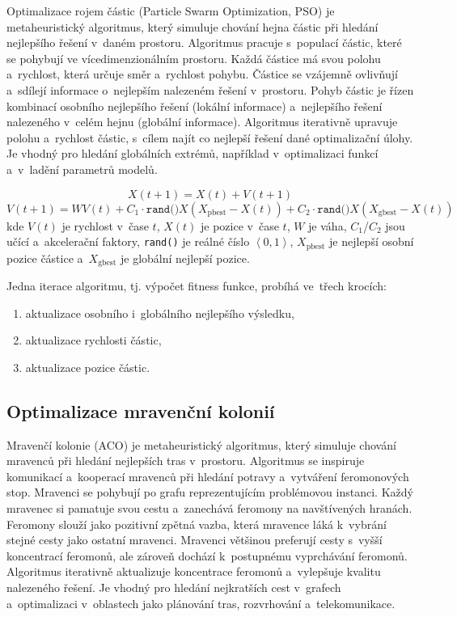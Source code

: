 Optimalizace rojem částic (Particle Swarm Optimization, PSO) je metaheuristický algoritmus, který simuluje chování hejna částic při hledání nejlepšího řešení v~daném prostoru.
Algoritmus pracuje s~populací částic, které se pohybují ve vícedimenzionálním prostoru.
Každá částice má svou polohu a~rychlost, která určuje směr a~rychlost pohybu.
Částice se vzájemně ovlivňují a~sdílejí informace o~nejlepším nalezeném řešení v~prostoru.
Pohyb částic je řízen kombinací osobního nejlepšího řešení (lokální informace) a~nejlepšího řešení nalezeného v~celém hejnu (globální informace).
Algoritmus iterativně upravuje polohu a~rychlost částic, s~cílem najít co nejlepší řešení dané optimalizační úlohy. Je vhodný pro hledání globálních extrémů, například v~optimalizaci funkcí a~v~ladění parametrů modelů.

$$X(t+1) = X(t) + V(t+1)$$
$$V(t+1) = WV(t) + C_1 \cdot \mathrm{\texttt{rand()}} X (X_\mathrm{pbest} - X(t)) + C_2 \cdot \mathrm{\texttt{rand()}} X (X_\mathrm{gbest} - X(t))$$
%
kde $V(t)$ je rychlost v~čase $t$, $X(t)$ je pozice v~čase $t$, $W$ je váha, $C_1$/$C_2$ jsou učící a~akcelerační faktory, \texttt{rand()} je reálné číslo $\left<0, 1\right>$, $X_\mathrm{pbest}$ je nejlepší osobní pozice částice a~$X_\mathrm{gbest}$ je globální nejlepší pozice.

Jedna iterace algoritmu, tj. výpočet fitness funkce, probíhá ve~třech krocích:

\begin{enumerate}
    \item aktualizace osobního i~globálního nejlepšího výsledku,
    \item aktualizace rychlosti částic,
    \item aktualizace pozice částic.
\end{enumerate}

\subsection{Optimalizace mravenční kolonií}

Mravenčí kolonie (ACO) je metaheuristický algoritmus, který simuluje chování mravenců při hledání nejlepších tras v~prostoru.
Algoritmus se inspiruje komunikací a~kooperací mravenců při hledání potravy a~vytváření feromonových stop.
Mravenci se pohybují po grafu reprezentujícím problémovou instanci.
Každý mravenec si pamatuje svou cestu a~zanechává feromony na navštívených hranách.
Feromony slouží jako pozitivní zpětná vazba, která mravence láká k~vybrání stejné cesty jako ostatní mravenci.
Mravenci většinou preferují cesty s~vyšší koncentrací feromonů, ale zároveň dochází k~postupnému vyprchávání feromonů.
Algoritmus iterativně aktualizuje koncentrace feromonů a~vylepšuje kvalitu nalezeného řešení. Je vhodný pro hledání nejkratších cest v~grafech a~optimalizaci v~oblastech jako plánování tras, rozvrhování a~telekomunikace.

